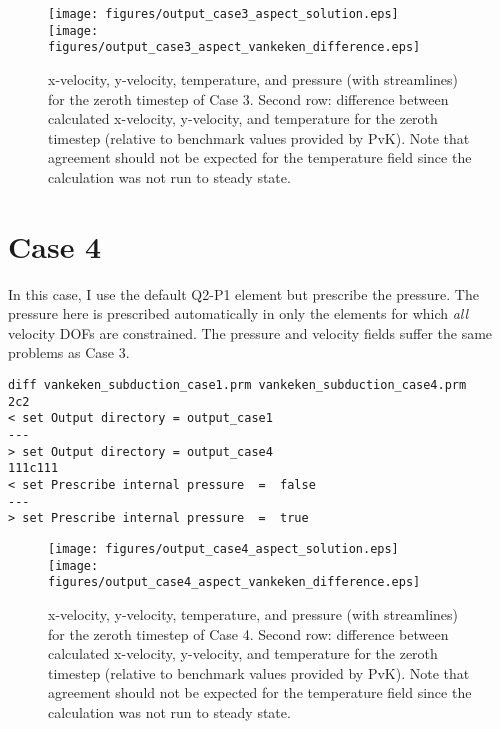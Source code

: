 \documentclass[11pt,letterpaper]{article}
\begin{document}
\begin{figure}[h]
\texttt{[image: figures/output\_case3\_aspect\_solution.eps]}\\
\texttt{[image: figures/output\_case3\_aspect\_vankeken\_difference.eps]}
\caption{x-velocity, y-velocity, temperature, and pressure (with streamlines) for the zeroth timestep of Case 3. Second row: difference between calculated x-velocity, y-velocity, and temperature for the zeroth timestep (relative to benchmark values provided by PvK). Note that agreement should not be expected for the temperature field since the calculation was not run to steady state.}
\end{figure}

\section{Case 4}
In this case, I use the default Q2-P1 element but prescribe the pressure. The pressure here is prescribed automatically in only the elements for which \emph{all} velocity DOFs are constrained. The pressure and velocity fields suffer the same problems as Case 3.

\begin{verbatim}
diff vankeken_subduction_case1.prm vankeken_subduction_case4.prm
2c2
< set Output directory = output_case1
---
> set Output directory = output_case4
111c111
< set Prescribe internal pressure  =  false
---
> set Prescribe internal pressure  =  true
\end{verbatim}

\begin{figure}[h]
\texttt{[image: figures/output\_case4\_aspect\_solution.eps]}\\
\texttt{[image: figures/output\_case4\_aspect\_vankeken\_difference.eps]}
\caption{x-velocity, y-velocity, temperature, and pressure (with streamlines) for the zeroth timestep of Case 4. Second row: difference between calculated x-velocity, y-velocity, and temperature for the zeroth timestep (relative to benchmark values provided by PvK). Note that agreement should not be expected for the temperature field since the calculation was not run to steady state.}
\end{figure}
\end{document}
